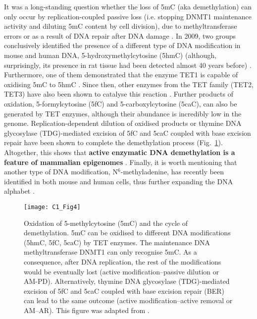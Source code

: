 It was a long-standing question whether the loss of 5mC (aka demethylation) can only occur by replication-coupled passive loss (i.e. stopping DNMT1 maintenance activity and diluting 5mC content by cell division), due to methyltransferase errors or as a result of DNA repair after DNA damage \cite{Iurlaro2017}. In 2009, two groups conclusively identified the presence of a different type of DNA modification in mouse and human DNA, 5-hydroxymethylcytosine (\acrshort{5hmC}) \cite{Kriaucionis2009,Tahiliani2009} (although, surprisingly, its presence in rat tissue had been detected almost 40 years before) \cite{Penn1972}. Furthermore, one of them demonstrated that the enzyme TET1 is capable of oxidising 5mC to 5hmC \cite{Tahiliani2009}. Since then, other enzymes from the TET family (TET2, TET3) have also been shown to catalyse this reaction \cite{Ito2010}. Further products of oxidation, 5-formylcytosine (\acrshort{5fC}) and 5-carboxylcytosine (\acrshort{5caC}), can also be generated by TET enzymes, although their abundance is incredibly low in the genome. Replication-dependent dilution of oxidised products or thymine DNA glycosylase (\acrshort{TDG})-mediated excision of 5fC and 5caC coupled with base excision repair have been shown to complete the demethylation process (Fig.~\ref{fig:c1_fig4}). Altogether, this shows that \textbf{active enzymatic DNA demethylation is a feature of mammalian epigenomes} \cite{Wu2017}. Finally, it is worth mentioning that another type of DNA modification, N$^6$-methyladenine, has recently been identified in both mouse and human cells, thus further expanding the DNA alphabet \cite{Wu2016,Xiao2018}.

\begin{figure}[htbp!] 
	\centering    
	\texttt{[image: C1\_Fig4]}
	\vspace*{1 mm}
	\caption[Oxidation of 5-methylcytosine and the cycle of demethylation]{Oxidation of 5-methylcytosine (5mC) and the cycle of demethylation. 5mC can be oxidised to different DNA modifications (5hmC, 5fC, 5caC) by TET enzymes. The maintenance DNA methyltransferase DNMT1 can only recognise 5mC. As a consequence, after DNA replication, the rest of the modifications would be eventually lost (active modification–passive dilution or AM-PD). Alternatively, thymine DNA glycosylase (\acrshort{TDG})-mediated excision of 5fC and 5caC coupled with base excision repair (\acrshort{BER}) can lead to the same outcome (active modification–active removal or AM–AR). This figure was adapted from \cite{Wu2017}.}
	\label{fig:c1_fig4}
\end{figure}


